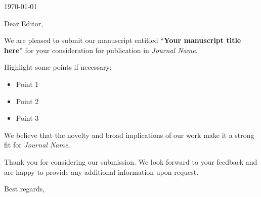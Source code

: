 \documentclass[JiaixnZhong]{CoverLetter}
\title{
    \vspace{-1.5em}
}
\begin{document}
\date{}
\maketitle

\thispagestyle{firststyle}

\noindent
\today

\noindent
Dear Editor,

We are pleased to submit our manuscript entitled ``\textbf{Your manuscript title here}'' for your consideration for publication in \emph{Journal Name}. 

\lipsum[1]

Highlight some points if necessary:
\begin{itemize}[itemsep = -6pt]
    \item Point 1
    \item Point 2
    \item Point 3
\end{itemize}



We believe that the novelty and broad implications of our work make it a strong fit for \emph{Journal Name}.

Thank you for considering our submission. We look forward to your feedback and are happy to provide any additional information upon request.



Best regards,

\AuthorSignature
\end{document}
